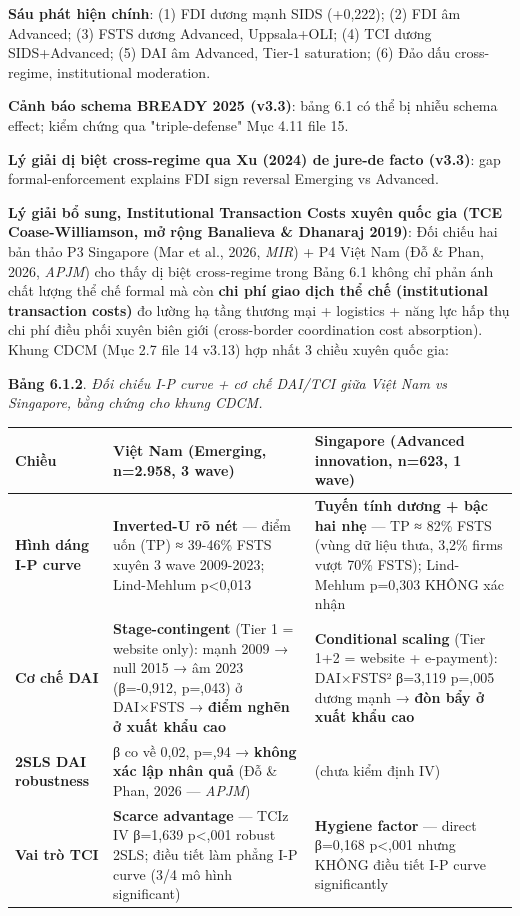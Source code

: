 \documentclass[12pt,a4paper]{article}
\begin{document}
\textbf{Sáu phát hiện chính}: (1) FDI dương mạnh SIDS (+0,222); (2) FDI
âm Advanced; (3) FSTS dương Advanced, Uppsala+OLI; (4) TCI dương
SIDS+Advanced; (5) DAI âm Advanced, Tier-1 saturation; (6) Đảo dấu
cross-regime, institutional moderation.

\textbf{Cảnh báo schema BREADY 2025 (v3.3)}: bảng 6.1 có thể bị nhiễu
schema effect; kiểm chứng qua "triple-defense" Mục 4.11 file 15.

\textbf{Lý giải dị biệt cross-regime qua Xu (2024) de jure-de facto
(v3.3)}: gap formal-enforcement explains FDI sign reversal Emerging vs
Advanced.

\textbf{Lý giải bổ sung, Institutional Transaction Costs xuyên quốc gia
(TCE Coase-Williamson, mở rộng Banalieva \& Dhanaraj 2019)}: Đối chiếu
hai bản thảo P3 Singapore (Mar et al., 2026, \emph{MIR}) + P4 Việt Nam
(Đỗ \& Phan, 2026, \emph{APJM}) cho thấy dị biệt cross-regime trong Bảng
6.1 không chỉ phản ánh chất lượng thể chế formal mà còn \textbf{chi phí
giao dịch thể chế (institutional transaction costs)} đo lường hạ tầng
thương mại + logistics + năng lực hấp thụ chi phí điều phối xuyên biên
giới (cross-border coordination cost absorption). Khung CDCM (Mục 2.7
file 14 v3.13) hợp nhất 3 chiều xuyên quốc gia:

\textbf{Bảng 6.1.2}. \emph{Đối chiếu I-P curve + cơ chế DAI/TCI giữa
Việt Nam vs Singapore, bằng chứng cho khung CDCM.}

\begin{longtable}[]{@{}lll@{}}
\toprule\noalign{}
Chiều & \textbf{Việt Nam (Emerging, n=2.958, 3 wave)} &
\textbf{Singapore (Advanced innovation, n=623, 1 wave)} \\
\midrule\noalign{}
\endhead
\bottomrule\noalign{}
\endlastfoot
\textbf{Hình dáng I-P curve} & \textbf{Inverted-U rõ nét} --- điểm uốn
(TP) ≈ 39-46\% FSTS xuyên 3 wave 2009-2023; Lind-Mehlum p\textless0,013
& \textbf{Tuyến tính dương + bậc hai nhẹ} --- TP ≈ 82\% FSTS (vùng dữ
liệu thưa, 3,2\% firms vượt 70\% FSTS); Lind-Mehlum p=0,303 KHÔNG xác
nhận \\
\textbf{Cơ chế DAI} & \textbf{Stage-contingent} (Tier 1 = website only):
mạnh 2009 → null 2015 → âm 2023 (β=-0,912, p=,043) ở DAI×FSTS →
\textbf{điểm nghẽn ở xuất khẩu cao} & \textbf{Conditional scaling} (Tier
1+2 = website + e-payment): DAI×FSTS² β=3,119 p=,005 dương mạnh →
\textbf{đòn bẩy ở xuất khẩu cao} \\
\textbf{2SLS DAI robustness} & β co về 0,02, p=,94 → \textbf{không xác
lập nhân quả} (Đỗ \& Phan, 2026 --- \emph{APJM}) & (chưa kiểm định
IV) \\
\textbf{Vai trò TCI} & \textbf{Scarce advantage} --- TCIz IV β=1,639
p\textless,001 robust 2SLS; điều tiết làm phẳng I-P curve (3/4 mô hình
significant) & \textbf{Hygiene factor} --- direct β=0,168 p\textless,001
nhưng KHÔNG điều tiết I-P curve significantly \\
\end{longtable}
\end{document}
